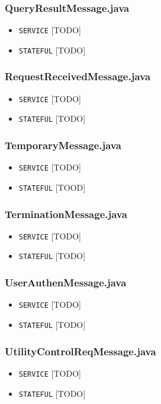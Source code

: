 \documentclass[12pt]{usenixsubmit}
\begin{document}
     \subsubsection{QueryResultMessage.java}
     \begin{itemize}
     \item {\tt SERVICE} [TODO]
     \item {\tt STATEFUL} [TODO]
     \end{itemize}

     \subsubsection{RequestReceivedMessage.java}
     \begin{itemize}
     \item {\tt SERVICE} [TODO]
     \item {\tt STATEFUL} [TODO]
     \end{itemize}

     \subsubsection{TemporaryMessage.java}
     \begin{itemize}
     \item {\tt SERVICE} [TODO]
     \item {\tt STATEFUL} [TOOD]
     \end{itemize}

     \subsubsection{TerminationMessage.java}
     \begin{itemize}
     \item {\tt SERVICE} [TODO]
     \item {\tt STATEFUL} [TODO]
     \end{itemize}

     \subsubsection{UserAuthenMessage.java}
     \begin{itemize}
     \item {\tt SERVICE} [TODO]
     \item {\tt STATEFUL} [TODO]
     \end{itemize}

    \subsubsection{UtilityControlReqMessage.java}
     \begin{itemize}
     \item {\tt SERVICE} [TODO]
     \item {\tt STATEFUL} [TODO]
     \end{itemize}
\end{document}
